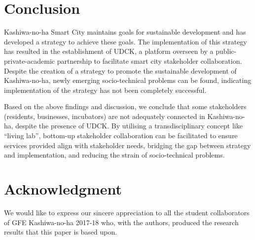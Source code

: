 \documentclass[conference]{IEEEtran}
\begin{document}

\section{\textbf{Conclusion}}

Kashiwa-no-ha Smart City maintains goals for sustainable development and has developed a strategy to achieve these goals. The implementation of this strategy has resulted in the establishment of UDCK, a platform overseen by a public-private-academic partnership to facilitate smart city stakeholder collaboration. Despite the creation of a strategy to promote the sustainable development of Kashiwa-no-ha, newly emerging socio-technical problems can be found, indicating implementation of the strategy has not been completely successful.

Based on the above findings and discussion, we conclude that some stakeholders (residents, businesses, incubators) are not adequately connected in Kashiwa-no-ha, despite the presence of UDCK. By utilising a transdisciplinary concept like ``living lab'', bottom-up stakeholder collaboration can be facilitated to ensure services provided align with stakeholder needs, bridging the gap between strategy and implementation, and reducing the strain of socio-technical problems.



\section*{\textbf{Acknowledgment}}


We would like to express our sincere appreciation to all the student collaborators of GFE Kashiwa-no-ha 2017-18 who, with the authors, produced the research results that this paper is based upon.




\end{document}
